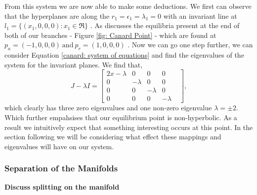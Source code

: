 From this system we are now able to make some deductions. We first can observe that the hyperplanes are along the $r_1=\epsilon_1=\lambda_1=0$ with an invariant line at $l_1=\{(x_1,0,0,0): x_1\in\Re\}$ \citep{krupa2001}. As \citet{krupa2001} discusses the equilibria present at the end of both of our branches - Figure \ref{fig: Canard Point} - which are found at $p_a=(-1,0,0,0) \ \text{and} \ p_r=(1,0,0,0)$ \citep{krupa2001}. Now we can go one step further, we can consider Equation \ref{canard: system of equations} and find the eigenvalues of the system for the invariant planes. We find that, 
\begin{equation}
J-\lambda I= \begin{bmatrix}
2x-\lambda & 0 & 0 & 0  \\
0 & -\lambda & 0 & 0&\\
0 & 0 & -\lambda & 0 \\
0 & 0 & 0 & -\lambda
\end{bmatrix},
\end{equation}
which clearly has three zero eigenvalues and one non-zero eigenvalue $\lambda=\pm 2$. Which further empahsises that our equilibrium point is non-hyperbolic. As a result we intuitively expect that something interesting occurs at this point. In the section following we will be considering what effect these mappings and eigenvalues will have on our system.

\subsubsection{Separation of the Manifolds}

\textbf{Discuss splitting on the manifold}

